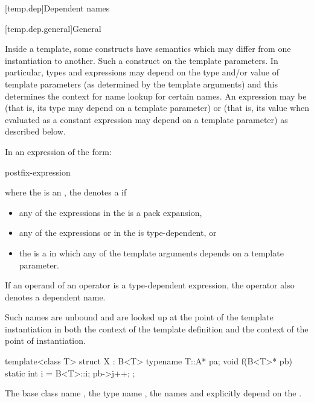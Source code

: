 [temp.dep]{Dependent names}

[temp.dep.general]{General}

\pnum
{}%
Inside a template, some constructs have semantics which may differ from one
instantiation to another.
Such a construct
on the template parameters.
In particular, types and expressions may depend on the type
and/or
value of
template parameters (as determined by the template arguments) and this determines
the context for name lookup for certain names.
An expression may be
(that is, its type may depend on a template parameter) or
(that is, its value when evaluated as a constant expression
may depend on a template parameter)
as described below.

\pnum
In an expression of the form:
\begin{ncsimplebnf}
postfix-expression \terminal{(}  \terminal{)}
\end{ncsimplebnf}
where the
is an
,
the
denotes a
if
\begin{itemize}
\item
any of the expressions in the  is a pack
expansion,
\item
any of the expressions
or 
in the
is type-dependent, or
\item
the 
is a  in which any of the template arguments depends
on a template parameter.
\end{itemize}

If an operand of an operator is a type-dependent expression, the operator
also denotes a dependent name.
\begin{note}
Such names are unbound and
are looked up at the point of the template instantiation in
both the context of the template definition and the
context of the point of instantiation.
\end{note}

\pnum
\begin{example}
\begin{codeblock}
template<class T> struct X : B<T> {
  typename T::A* pa;
  void f(B<T>* pb) {
    static int i = B<T>::i;
    pb->j++;
  }
};
\end{codeblock}

The base class name
,
the type name
,
the names
and
explicitly depend on the
.
\end{example}

